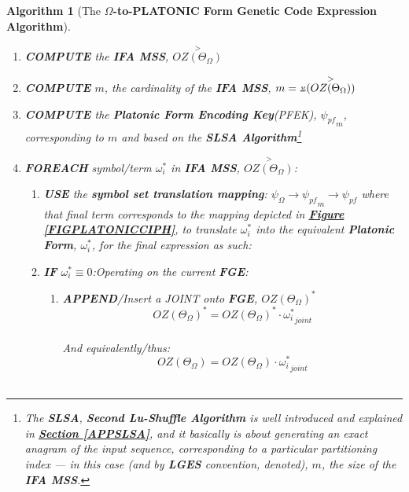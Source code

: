 \documentclass[a4paper, 18pt]{book} %
\newtheorem{alg}{Algorithm}
\newcommand{\invpi}{\rotatebox[origin=c]{180}{$\pi$}}
\begin{document}
\begin{alg}[The \textbf{$\Omega$-to-PLATONIC Form Genetic Code Expression Algorithm}]
\begin{enumerate}
{\begin{enumerate}
{}
\item {
	\textbf{COMPUTE} the \textbf{IFA MSS}, $\overset{>}{OZ(\Theta_\Omega)}$
}
\item {
	\textbf{COMPUTE} $m$, the cardinality of the \textbf{IFA MSS}, $m = \invpi(\overset{>}{OZ(\Theta_\Omega)})$
}
\item {
	\textbf{COMPUTE} the \textbf{Platonic Form Encoding Key}(PFEK), $\boxed{\psi_{pf}}_m$, corresponding to $m$ and based on the \textbf{SLSA Algorithm}\footnote{The \textbf{SLSA}, \textbf{Second Lu-Shuffle Algorithm} is well introduced and explained in \textbf{\hyperref[APPSLSA]{Section \ref{APPSLSA}}}, and it basically is about generating an exact anagram of the input sequence, corresponding to a particular partitioning index --- in this case (and by \textbf{LGES} convention, denoted), $m$, the size of the \textbf{IFA MSS}.}
}
\item{\textbf{FOREACH} symbol/term $\omega_i^*$ in \textbf{IFA MSS}, $\overset{>}{OZ(\Theta_\Omega)}$: 
\begin{enumerate}
    \item{\textbf{USE} the \textbf{symbol set translation mapping}: $\psi_\Omega \rightarrow \boxed{\psi_{pf}}_m \rightarrow \psi_{pf}$ where that final term corresponds to the mapping depicted in \textbf{\hyperref[FIGPLATONICCIPH]{Figure \ref{FIGPLATONICCIPH}}}, to translate $\omega_i^*$ into the equivalent \textbf{Platonic Form}, $\boxed{\omega_i^*}$, for the final expression as such:}
\item { \textbf{IF} $\omega_i^* \equiv 0$:Operating on the current \textbf{FGE}: 
		\begin{enumerate}
		\item { \textbf{APPEND}/Insert a JOINT onto \textbf{FGE},  $\boxed{OZ(\Theta_\Omega)}^*$\\

		\begin{equation}
		\label{EQEXTFGEJOINT}
		\boxed{OZ(\Theta_\Omega)}^* = \boxed{OZ(\Theta_\Omega)}^* \cdot \boxed{\omega_i^*}_{joint}
		\end{equation}\\		
		
		And equivalently/thus:\\
		
		\begin{equation}
		\label{EQEXTFGEJOINTSUF}
		\boxed{OZ(\Theta_\Omega)} = \boxed{OZ(\Theta_\Omega)} \cdot \boxed{\omega_i^*}_{joint}
		\end{equation}\\				
		
}
\end{enumerate}}
\end{enumerate}}
\end{enumerate}}
\end{enumerate}
\end{alg}
\end{document}
